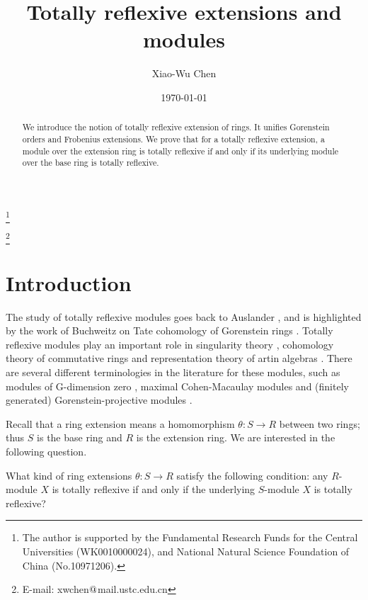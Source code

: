 \documentclass[a4paper]{amsart}
\theoremstyle{definition}
\theoremstyle{remark}
\numberwithin{equation}{section}
\begin{document}
\title[Totally reflexive extensions and modules]{Totally reflexive extensions and modules}

\author[  Xiao-Wu Chen
] {Xiao-Wu Chen}

\thanks{The author is supported by the Fundamental Research Funds for the Central Universities (WK0010000024), and National Natural Science Foundation of China (No.10971206).}
\date{\today}

\thanks{E-mail:
xwchen$\symbol{64}$mail.ustc.edu.cn}
\maketitle

\dedicatory{}\commby{}

\begin{abstract}
We introduce the notion of totally reflexive extension of rings. It unifies Gorenstein orders and Frobenius extensions. We prove that for a totally reflexive extension, a module over the extension ring is totally reflexive if and only if its underlying module over the base ring is totally reflexive.
\end{abstract}

\section{Introduction}

The study of totally reflexive modules goes back to Auslander \cite{Au, ABr}, and is highlighted by
the work of Buchweitz on Tate cohomology of Gorenstein rings \cite{Buc}. Totally reflexive modules play
an important role in singularity theory \cite{Buc, Yoh}, cohomology theory of commutative rings \cite{AM, CFH}
and representation theory of artin algebras \cite{AR, RZ}. There are several different terminologies in the literature for these modules, such as modules of G-dimension zero \cite{ABr}, maximal Cohen-Macaulay modules \cite{Buc} and (finitely generated) Gorenstein-projective modules \cite{EJ1, Ch3}.

Recall that a ring extension means a homomorphism  $\theta\colon S\rightarrow R$ between two rings; thus $S$ is the base ring and
$R$ is the extension ring. We are interested in the following question.

What kind of ring extensions $\theta\colon S\rightarrow R$ satisfy the following condition: any $R$-module $X$ is totally reflexive if and only if the underlying $S$-module $X$ is totally reflexive?
\end{document}
